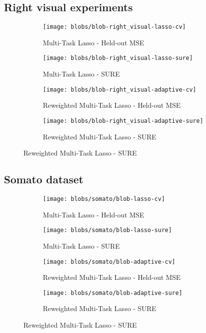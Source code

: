 \subsection{Right visual experiments}

\begin{figure}
    \centering
    \begin{subfigure}{6cm}
        \centering \texttt{[image: blobs/blob-right\_visual-lasso-cv]}
        \caption{Multi-Task Lasso - Held-out MSE}
    \end{subfigure}
    \begin{subfigure}{6cm}
        \centering \texttt{[image: blobs/blob-right\_visual-lasso-sure]}
        \caption{Multi-Task Lasso - SURE}
    \end{subfigure}

    \begin{subfigure}{6cm}
        \centering \texttt{[image: blobs/blob-right\_visual-adaptive-cv]}
        \caption{Reweighted Multi-Task Lasso - Held-out MSE}
    \end{subfigure}
    \begin{subfigure}{6cm}
        \centering \texttt{[image: blobs/blob-right\_visual-adaptive-sure]}
        \caption{Reweighted Multi-Task Lasso - SURE}
    \end{subfigure}
\end{figure}


\subsection{Somato dataset}

\begin{figure}
    \centering
    \begin{subfigure}{6cm}
        \centering \texttt{[image: blobs/somato/blob-lasso-cv]}
        \caption{Multi-Task Lasso - Held-out MSE}
    \end{subfigure}
    \begin{subfigure}{6cm}
        \centering \texttt{[image: blobs/somato/blob-lasso-sure]}
        \caption{Multi-Task Lasso - SURE}
    \end{subfigure}

    \begin{subfigure}{6cm}
        \centering \texttt{[image: blobs/somato/blob-adaptive-cv]}
        \caption{Reweighted Multi-Task Lasso - Held-out MSE}
    \end{subfigure}
    \begin{subfigure}{6cm}
        \centering \texttt{[image: blobs/somato/blob-adaptive-sure]}
        \caption{Reweighted Multi-Task Lasso - SURE}
    \end{subfigure}
\end{figure}


